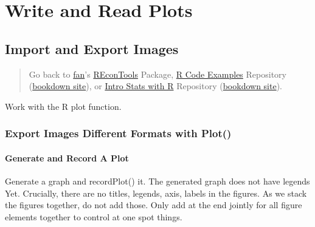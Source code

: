 \documentclass[
]{book}
\begin{document}
\hypertarget{write-and-read-plots}{%
\section{Write and Read Plots}\label{write-and-read-plots}}

\hypertarget{import-and-export-images}{%
\subsection{Import and Export Images}\label{import-and-export-images}}

\begin{quote}
Go back to \href{http://fanwangecon.github.io/}{fan}'s \href{https://fanwangecon.github.io/REconTools/}{REconTools} Package, \href{https://fanwangecon.github.io/R4Econ/}{R Code Examples} Repository (\href{https://fanwangecon.github.io/R4Econ/bookdown}{bookdown site}), or \href{https://fanwangecon.github.io/Stat4Econ/}{Intro Stats with R} Repository (\href{https://fanwangecon.github.io/Stat4Econ/bookdown}{bookdown site}).
\end{quote}

Work with the R plot function.

\hypertarget{export-images-different-formats-with-plot}{%
\subsubsection{Export Images Different Formats with Plot()}\label{export-images-different-formats-with-plot}}

\hypertarget{generate-and-record-a-plot}{%
\paragraph{Generate and Record A Plot}\label{generate-and-record-a-plot}}

Generate a graph and recordPlot() it. The generated graph does not have legends Yet. Crucially, there are no titles, legends, axis, labels in the figures. As we stack the figures together, do not add those. Only add at the end jointly for all figure elements together to control at one spot things.
\end{document}
